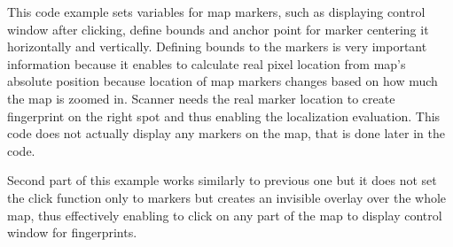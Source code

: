 This code example sets variables for map markers, such as displaying control window after clicking, define bounds and anchor point for marker centering it horizontally and vertically. Defining bounds to the markers is very important information because it enables to calculate real pixel location from map's absolute position because location of map markers changes based on how much the map is zoomed in. Scanner needs the real marker location to create fingerprint on the right spot and thus enabling the localization evaluation. This code does not actually display any markers on the map, that is done later in the code.

Second part of this example works similarly to previous one but it does not set the click function only to markers but creates an invisible overlay over the whole map, thus effectively enabling to click on any part of the map to display control window for fingerprints.